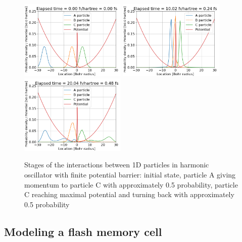\begin{figure}[hbt!]
	\begin{center}
		\includegraphics[width=0.45\textwidth]{figures/1d_oscillator_tunneling_01.png}
		\includegraphics[width=0.45\textwidth]{figures/1d_oscillator_tunneling_02.png}
		\includegraphics[width=0.45\textwidth]{figures/1d_oscillator_tunneling_03.png}
		\caption{Stages of the interactions between 1D particles in harmonic oscillator with finite potential barrier: initial state, particle A giving momentum to particle C with approximately 0.5 probability, particle C reaching maximal potential and turning back with approximately 0.5 probability}
		\label{fig:1d_osc_with_tunneling}
	\end{center}	
\end{figure}

\subsection{Modeling a flash memory cell}

